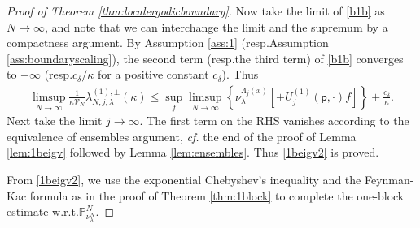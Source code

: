 \documentclass[11pt]{amsart}
\theoremstyle{plain}
\theoremstyle{definition}
\theoremstyle{remark}
\newcommand{\pt}{\mathsf{p}}
\newcommand{\Uone}[1]{U^{(1)}_{{#1}}}
\begin{document}
\begin{proof}[Proof of Theorem \ref{thm:localergodicboundary}]
Now take the limit of \eqref{b1b} as $N\to\infty$, and note that we can interchange the limit and the supremum by a compactness argument. By Assumption \ref{ass:1} (resp.\@ Assumption \ref{ass:boundaryscaling}), the second term (resp.\@ the third term) of \eqref{b1b} converges to $-\infty$ (resp.\@ $c_\delta/\kappa$ for a positive constant $c_\delta$). Thus
\begin{align*}
\limsup_{N\to\infty} \frac{1}{\kappa \mathcal{V}_N} \lambda^{(1),\pm}_{N,j,\lambda}(\kappa) \leq \sup_f \limsup_{N\to\infty}\left\{\nu_\lambda^{\Lambda_j(x)}\left[\pm \Uone{j}(\pt,\cdot)f\right] \right\} + \frac{c_\delta}{\kappa}.
\end{align*}
Next take the limit $j\to\infty$. The first term on the RHS vanishes according to the equivalence of ensembles argument, \emph{cf.\@} the end of the proof of Lemma \ref{lem:1beigv} followed by Lemma \ref{lem:ensembles}. Thus \eqref{1beigv2} is proved. 

From \eqref{1beigv2}, we use the exponential Chebyshev's inequality and the Feynman-Kac formula as in the proof of Theorem \ref{thm:1block} to complete the one-block estimate w.r.t.\@ $\mathbb{P}^N_{\nu^N_\lambda}$.


\end{proof}
\end{document}
